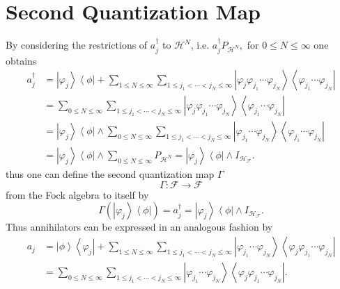 \documentclass[aps,preprint,amsfonts,amssymb,showpacs,showkeys]{revtex4}%
\begin{document}
\section{Second Quantization Map \label{SecQuant}}

By considering the restrictions of $a_{j}^{\dagger}$ to $\mathcal{H}^{N}$,
i.e. $a_{j}^{\dagger}P_{\mathcal{H}^{N}},$ for $0\leq N\leq\infty$ one obtains%
\begin{align}
a_{j}^{\dagger}  &  =\left\vert \varphi_{j}\right\rangle \left\langle
\phi\right\vert +\sum_{1\leq N\leq\infty}\sum_{1\leq j_{1}<\cdots<j_{N}%
\leq\infty}\left\vert \varphi_{j}\varphi_{j_{1}}\cdots\varphi_{j_{N}%
}\right\rangle \left\langle \varphi_{j_{1}}\cdots\varphi_{j_{N}}\right\vert
\nonumber\\
&  =\sum_{0\leq N\leq\infty}\sum_{1\leq j_{1}<\cdots<j_{N}\leq\infty
}\left\vert \varphi_{j}\varphi_{j_{1}}\cdots\varphi_{j_{N}}\right\rangle
\left\langle \varphi_{j_{1}}\cdots\varphi_{j_{N}}\right\vert \nonumber\\
&  =\left\vert \varphi_{j}\right\rangle \left\langle \phi\right\vert
\wedge\sum_{0\leq N\leq\infty}\sum_{1\leq j_{1}<\cdots<j_{N}\leq\infty
}\left\vert \varphi_{j_{1}}\cdots\varphi_{j_{N}}\right\rangle \left\langle
\varphi_{j_{1}}\cdots\varphi_{j_{N}}\right\vert \nonumber\\
&  =\left\vert \varphi_{j}\right\rangle \left\langle \phi\right\vert
\wedge\sum_{0\leq N\leq\infty}P_{\mathcal{H}^{N}}=\left\vert \varphi
_{j}\right\rangle \left\langle \phi\right\vert \wedge I_{\mathcal{H}%
_{\mathcal{F}}}.
\end{align}
thus one can define the second quantization map $\Gamma$
\begin{equation}
\Gamma:\mathcal{F\rightarrow F}%
\end{equation}
from the Fock algebra to itself by
\begin{equation}
\Gamma\left(  \left\vert \varphi_{j}\right\rangle \left\langle \phi\right\vert
\right)  =a_{j}^{\dagger}=\left\vert \varphi_{j}\right\rangle \left\langle
\phi\right\vert \wedge I_{\mathcal{H}_{\mathcal{F}}}.
\end{equation}
Thus annihilators can be expressed in an analogous fashion by
\begin{align}
a_{j}  &  =\left\vert \phi\right\rangle \left\langle \varphi_{j}\right\vert
+\sum_{1\leq N\leq\infty}\sum_{1\leq j_{1}<\cdots<j_{N}\leq\infty}\left\vert
\varphi_{j_{1}}\cdots\varphi_{j_{N}}\right\rangle \left\langle \varphi
_{j}\varphi_{j_{1}}\cdots\varphi_{j_{N}}\right\vert \nonumber\\
&  =\sum_{0\leq N\leq\infty}\sum_{1\leq j_{1}<\cdots<j_{N}\leq\infty
}\left\vert \varphi_{j_{1}}\cdots\varphi_{j_{N}}\right\rangle \left\langle
\varphi_{j}\varphi_{j_{1}}\cdots\varphi_{j_{N}}\right\vert .
\end{align}
\end{document}
